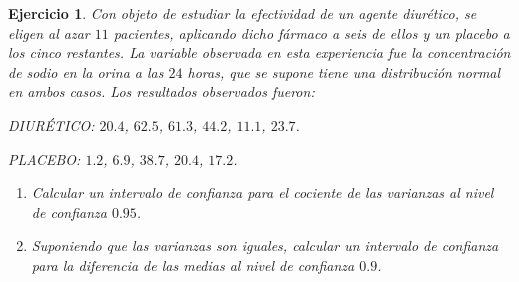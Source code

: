\documentclass[11pt]{report}
\newtheorem{ejercicio}{Ejercicio}
\begin{document}
\begin{ejercicio}
  Con objeto de estudiar la efectividad de un agente diurético, se eligen al azar $11$ pacientes, aplicando dicho fármaco a seis de ellos y un placebo a los cinco restantes. La variable observada en esta experiencia fue la concentración de sodio en la orina a las $24$ horas, que se supone tiene una distribución normal en ambos casos. Los resultados observados fueron:

  DIURÉTICO: $20.4$, $62.5$, $61.3$, $44.2$, $11.1$, $23.7$.

  PLACEBO: $1.2$, $6.9$, $38.7$, $20.4$, $17.2$.

  \begin{enumerate}
    \item Calcular un intervalo de confianza para el cociente de las varianzas al nivel de confianza $0.95$.
    \item Suponiendo que las varianzas son iguales, calcular un intervalo de confianza para la diferencia de las medias al nivel de confianza $0.9$.
  \end{enumerate}
\end{ejercicio}
\end{document}
